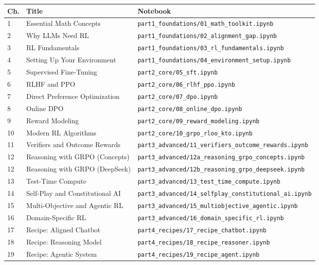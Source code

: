 \begin{chapterenv}
\begin{longtable}{p{}p{}p{}}
\toprule
\textbf{Ch.} & \textbf{Title} & \textbf{Notebook} \\
\midrule
\endhead
1 & Essential Math Concepts & \texttt{part1\_foundations/01\_math\_toolkit.ipynb} \\
2 & Why LLMs Need RL & \texttt{part1\_foundations/02\_alignment\_gap.ipynb} \\
3 & RL Fundamentals & \texttt{part1\_foundations/03\_rl\_fundamentals.ipynb} \\
4 & Setting Up Your Environment & \texttt{part1\_foundations/04\_environment\_setup.ipynb} \\
\midrule
5  & Supervised Fine-Tuning        & \texttt{part2\_core/05\_sft.ipynb} \\
6  & RLHF and PPO                  & \texttt{part2\_core/06\_rlhf\_ppo.ipynb} \\
7  & Direct Preference Optimization & \texttt{part2\_core/07\_dpo.ipynb} \\
8  & Online DPO                    & \texttt{part2\_core/08\_online\_dpo.ipynb} \\
9  & Reward Modeling               & \texttt{part2\_core/09\_reward\_modeling.ipynb} \\
10 & Modern RL Algorithms          & \texttt{part2\_core/10\_grpo\_rloo\_kto.ipynb} \\
\midrule
11 & Verifiers and Outcome Rewards      & \texttt{part3\_advanced/11\_verifiers\_outcome\_rewards.ipynb} \\
12 & Reasoning with GRPO (Concepts)     & \texttt{part3\_advanced/12a\_reasoning\_grpo\_concepts.ipynb} \\
12 & Reasoning with GRPO (DeepSeek)     & \texttt{part3\_advanced/12b\_reasoning\_grpo\_deepseek.ipynb} \\
13 & Test-Time Compute                  & \texttt{part3\_advanced/13\_test\_time\_compute.ipynb} \\
14 & Self-Play and Constitutional AI    & \texttt{part3\_advanced/14\_selfplay\_constitutional\_ai.ipynb} \\
15 & Multi-Objective and Agentic RL     & \texttt{part3\_advanced/15\_multiobjective\_agentic.ipynb} \\
16 & Domain-Specific RL                 & \texttt{part3\_advanced/16\_domain\_specific\_rl.ipynb} \\
\midrule
17 & Recipe: Aligned Chatbot   & \texttt{part4\_recipes/17\_recipe\_chatbot.ipynb} \\
18 & Recipe: Reasoning Model   & \texttt{part4\_recipes/18\_recipe\_reasoner.ipynb} \\
19 & Recipe: Agentic System    & \texttt{part4\_recipes/19\_recipe\_agent.ipynb} \\
\bottomrule
\end{longtable}


\end{chapterenv}

